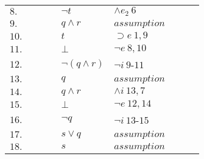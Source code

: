\documentclass[12pt]{article}
\begin{document}
\begin{itemize}
\begin{table}[H]
\begin{tabular}{*9{l}}
			$8.$ &\multicolumn{1}{|c}{} & & & $\neg t$ & $\land e_2 \ 6$ & & &\multicolumn{1}{c|}{}\\
			
			\cline{3-8}
			
			$9.$ & \multicolumn{1}{|c}{} & \multicolumn{1}{|c}{} &  & $q \land r$ & $assumption$ & & \multicolumn{1}{c|}{} &\multicolumn{1}{c|}{}\\
			
			$10.$ & \multicolumn{1}{|c}{} & \multicolumn{1}{|c}{} & & $t$ & $\supset e \ 1, 9$ & & \multicolumn{1}{c|}{} &\multicolumn{1}{c|}{}\\
			
			$11.$ & \multicolumn{1}{|c}{} & \multicolumn{1}{|c}{} & & $\bot$ & $\neg e \ 8, 10$ & & \multicolumn{1}{c|}{} &\multicolumn{1}{c|}{}\\
			
			\cline{3-8}
			
			$12.$ &\multicolumn{1}{|c}{} & & & $\neg (q \land r)$ & $\neg i \ 9$-$11$ & & &\multicolumn{1}{c|}{}\\
			
			\cline{3-8}
			
			$13.$ & \multicolumn{1}{|c}{} & \multicolumn{1}{|c}{} & & $q$ & $assumption$ & & \multicolumn{1}{c|}{} &\multicolumn{1}{c|}{}\\
			
			$14.$ & \multicolumn{1}{|c}{} & \multicolumn{1}{|c}{} & & $q \land r$ & $\land i \ 13, 7$ & & \multicolumn{1}{c|}{} &\multicolumn{1}{c|}{}\\
			
			$15.$ & \multicolumn{1}{|c}{} & \multicolumn{1}{|c}{} & & $\bot$ & $\neg e \ 12, 14$ & & \multicolumn{1}{c|}{} &\multicolumn{1}{c|}{}\\
			
			\cline{3-8}
			
			$16.$ &\multicolumn{1}{|c}{} & & & $\neg q$ & $\neg i \ 13$-$15$ & & &\multicolumn{1}{c|}{}\\
			
			\cline{3-8}
			
			$17.$ & \multicolumn{1}{|c}{} & \multicolumn{1}{|c}{} & & $s \lor q$ & $assumption$ & & \multicolumn{1}{c|}{} &\multicolumn{1}{c|}{}\\
			
			\cline{4-6}
			
			$18.$ & \multicolumn{1}{|c}{} & \multicolumn{1}{|c}{} & \multicolumn{1}{|c}{} & $s$ & $assumption$ & \multicolumn{1}{|c}{} & \multicolumn{1}{c|}{} &\multicolumn{1}{c|}{}\\
			

\end{tabular}
\end{table}
\end{itemize}
\end{document}

